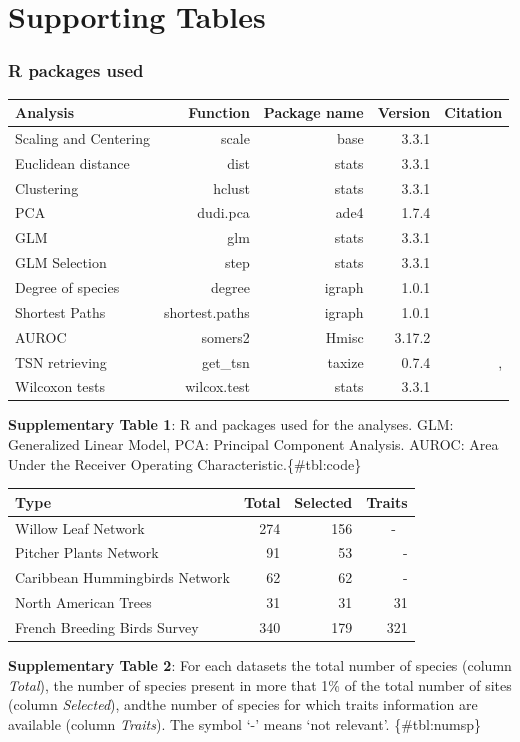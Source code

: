\section{Supporting Tables}\label{supporting-tables}

\subsubsection{R packages used}\label{r-packages-used}

\begin{longtable}[]{@{}lrrrr@{}}
\toprule
Analysis & Function & Package name & Version & Citation\tabularnewline
\midrule
\endhead
Scaling and Centering & scale & base & 3.3.1 &
\citet{Rcoreteam2015}\tabularnewline
Euclidean distance & dist & stats & 3.3.1 &
\citet{Rcoreteam2015}\tabularnewline
Clustering & hclust & stats & 3.3.1 &
\citet{Rcoreteam2015}\tabularnewline
PCA & dudi.pca & ade4 & 1.7.4 & \citet{Dray2007}\tabularnewline
GLM & glm & stats & 3.3.1 & \citet{Rcoreteam2015}\tabularnewline
GLM Selection & step & stats & 3.3.1 &
\citet{Rcoreteam2015}\tabularnewline
Degree of species & degree & igraph & 1.0.1 &
\citet{Csardi2006}\tabularnewline
Shortest Paths & shortest.paths & igraph & 1.0.1 &
\citet{Csardi2006}\tabularnewline
AUROC & somers2 & Hmisc & 3.17.2 & \citet{Harrell2016}\tabularnewline
TSN retrieving & get\_tsn & taxize & 0.7.4 & \citet{hamberlain2013},
\citet{Chamberlain2016}\tabularnewline
Wilcoxon tests & wilcox.test & stats & 3.3.1 &
\citet{Rcoreteam2015}\tabularnewline
\bottomrule
\end{longtable}

\textbf{Supplementary Table 1}: R and packages used for the analyses.
GLM: Generalized Linear Model, PCA: Principal Component Analysis. AUROC:
Area Under the Receiver Operating Characteristic.\{\#tbl:code\}

\begin{longtable}[]{@{}lrrr@{}}
\toprule
Type & Total & Selected & Traits\tabularnewline
\midrule
\endhead
Willow Leaf Network & 274 & 156 & - ~\tabularnewline
Pitcher Plants Network & 91 & 53 & -\tabularnewline
Caribbean Hummingbirds Network & 62 & 62 & -\tabularnewline
North American Trees & 31 & 31 & 31\tabularnewline
French Breeding Birds Survey & 340 & 179 & 321\tabularnewline
\bottomrule
\end{longtable}

\textbf{Supplementary Table 2}: For each datasets the total number of
species (column \emph{Total}), the number of species present in more
that 1\% of the total number of sites (column \emph{Selected}), andthe
number of species for which traits information are available (column
\emph{Traits}). The symbol `-' means `not relevant'. \{\#tbl:numsp\}


